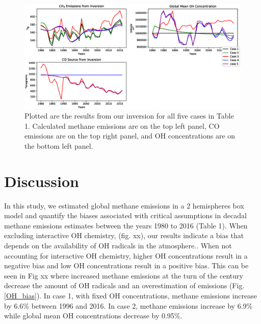 \documentclass[two column,grl]{AGUTeX}
\begin{document}
\begin{article}
\begin{figure} \label{all_runs}
\begin{center}
\includegraphics[width=\textwidth]{case_emissions.eps}
\end{center}
\caption{Plotted are the results from our inversion for all five cases in Table 1. Calculated methane emissions are on the top left panel, CO emissions are on the top right panel, and OH concentrations are on the bottom left panel.}
\end{figure}



\section{Discussion}

In this study, we estimated global methane emissions in a 2 hemispheres box model and quantify the biases associated with critical assumptions in decadal methane emissions estimates between the years 1980 to 2016 (Table 1). When excluding interactive OH chemistry, (fig. xx), our results indicate a bias that depends on the availability of OH radicals in the atmosphere.. When not accounting for interactive OH chemistry, higher OH concentrations result in a negative bias and low OH concentrations result in a positive bias. This can be seen in Fig xx where increased methane emissions at the turn of the century decrease the amount of OH radicals and an overestimation of emissions (Fig. \ref{OH_bias}). In case 1, with fixed OH concentrations, methane emissions increase by 6.6\% between 1996 and 2016.  In case 2, methane emissions increase by 6.9\% while global mean OH concentrations decrease by 0.95\%.


\end{article}
\end{document}
